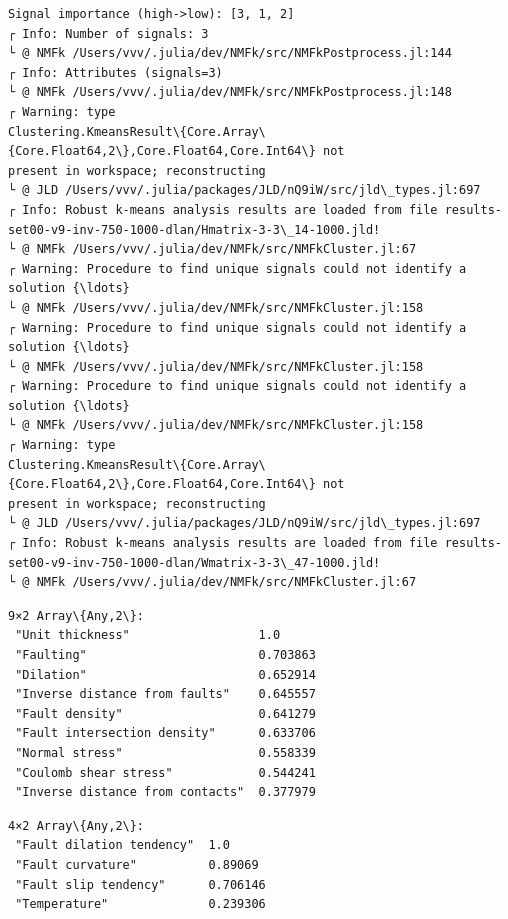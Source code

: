 \documentclass[11pt]{article}
\begin{document}
    \begin{Verbatim}[commandchars=\\\{\}]
Signal importance (high->low): [3, 1, 2]
┌ Info: Number of signals: 3
└ @ NMFk /Users/vvv/.julia/dev/NMFk/src/NMFkPostprocess.jl:144
┌ Info: Attributes (signals=3)
└ @ NMFk /Users/vvv/.julia/dev/NMFk/src/NMFkPostprocess.jl:148
┌ Warning: type
Clustering.KmeansResult\{Core.Array\{Core.Float64,2\},Core.Float64,Core.Int64\} not
present in workspace; reconstructing
└ @ JLD /Users/vvv/.julia/packages/JLD/nQ9iW/src/jld\_types.jl:697
┌ Info: Robust k-means analysis results are loaded from file results-
set00-v9-inv-750-1000-dlan/Hmatrix-3-3\_14-1000.jld!
└ @ NMFk /Users/vvv/.julia/dev/NMFk/src/NMFkCluster.jl:67
┌ Warning: Procedure to find unique signals could not identify a solution {\ldots}
└ @ NMFk /Users/vvv/.julia/dev/NMFk/src/NMFkCluster.jl:158
┌ Warning: Procedure to find unique signals could not identify a solution {\ldots}
└ @ NMFk /Users/vvv/.julia/dev/NMFk/src/NMFkCluster.jl:158
┌ Warning: Procedure to find unique signals could not identify a solution {\ldots}
└ @ NMFk /Users/vvv/.julia/dev/NMFk/src/NMFkCluster.jl:158
┌ Warning: type
Clustering.KmeansResult\{Core.Array\{Core.Float64,2\},Core.Float64,Core.Int64\} not
present in workspace; reconstructing
└ @ JLD /Users/vvv/.julia/packages/JLD/nQ9iW/src/jld\_types.jl:697
┌ Info: Robust k-means analysis results are loaded from file results-
set00-v9-inv-750-1000-dlan/Wmatrix-3-3\_47-1000.jld!
└ @ NMFk /Users/vvv/.julia/dev/NMFk/src/NMFkCluster.jl:67
    \end{Verbatim}


    \begin{Verbatim}[commandchars=\\\{\}]
9×2 Array\{Any,2\}:
 "Unit thickness"                  1.0
 "Faulting"                        0.703863
 "Dilation"                        0.652914
 "Inverse distance from faults"    0.645557
 "Fault density"                   0.641279
 "Fault intersection density"      0.633706
 "Normal stress"                   0.558339
 "Coulomb shear stress"            0.544241
 "Inverse distance from contacts"  0.377979
    \end{Verbatim}



    \begin{Verbatim}[commandchars=\\\{\}]
4×2 Array\{Any,2\}:
 "Fault dilation tendency"  1.0
 "Fault curvature"          0.89069
 "Fault slip tendency"      0.706146
 "Temperature"              0.239306
    \end{Verbatim}
\end{document}
